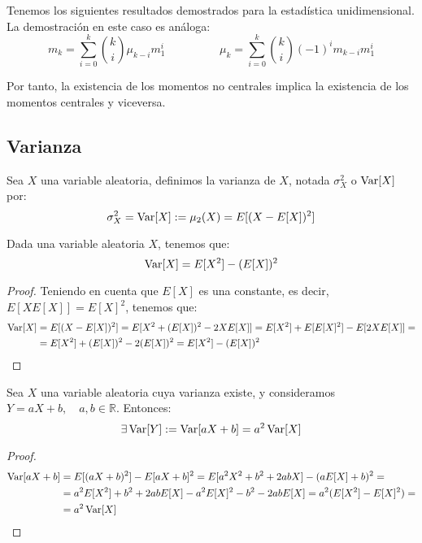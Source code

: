 Tenemos los siguientes resultados demostrados para la estadística unidimensional. La demostración en este caso es análoga:
\begin{equation*}
    m_{k} = \sum_{i=0}^k\binom{k}{i} \mu_{k-i}m_1^i
    \hspace{2cm}
    \mu_{k} = \sum_{i=0}^k\binom{k}{i} (-1)^i m_{k-i} m_1^i
\end{equation*}

Por tanto, la existencia de los momentos no centrales implica la existencia de los momentos centrales y viceversa.

\subsection{Varianza}
\begin{definicion}
    Sea $X$ una variable aleatoria, definimos la varianza de $X$, notada $\sigma_X^2$ o $\operatorname{Var}[X]$ por:
    $$\sigma_X^2 = \operatorname{Var}[X] := \mu_2(X) = E[(X-E[X])^2]$$
\end{definicion}


\begin{prop}
    Dada una variable aleatoria $X$, tenemos que:
    \begin{equation*}
        \operatorname{Var}[X] = E[X^2] - (E[X])^2
    \end{equation*}
\end{prop}
\begin{proof}
    Teniendo en cuenta que $E[X]$ es una constante, es decir, $E[XE[X]]=E[X]^2$, tenemos que:
    \begin{align*}
        \operatorname{Var}[X] &= E[(X-E[X])^2] = E[X^2 + (E[X])^2 - 2XE[X]]
        = E[X^2] + E[E[X]^2] - E[2XE[X]] =\\&=
        E[X^2] + (E[X])^2 -2(E[X])^2
        = E[X^2] - (E[X])^2
    \end{align*}
\end{proof}


\begin{prop}
    Sea $X$ una variable aleatoria cuya varianza existe, y consideramos $Y=aX+b,\quad a,b\in \mathbb{R}$. Entonces:
    \begin{equation*}
        \exists \operatorname{Var}[Y] := \operatorname{Var}[aX+b] = a^2\operatorname{Var}[X]
    \end{equation*}
\end{prop}
\begin{proof}
    \begin{align*}
        \operatorname{Var}[aX+b]
        &= E[(aX+b)^2] -E[aX+b]^2
        = E[a^2X^2 + b^2 +2abX] - (aE[X]+b)^2
        =\\&= a^2E[X^2] + b^2 +2abE[X] -a^2E[X]^2 -b^2 -2abE[X] =  a^2(E[X^2] - E[X]^2) =\\&= a^2\operatorname{Var}[X]
    \end{align*}
\end{proof}

